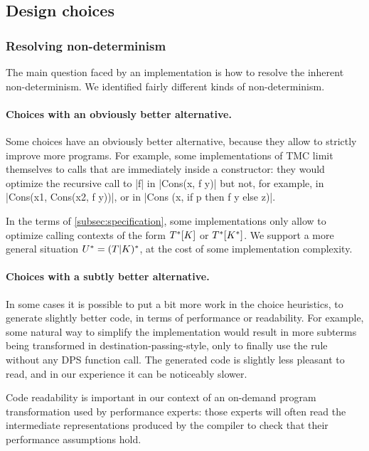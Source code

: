 \subsection{Design choices}

\subsubsection{Resolving non-determinism}

The main question faced by an implementation is how to resolve the
inherent non-determinism. We identified fairly different kinds of
non-determinism.

\paragraph{Choices with an obviously better alternative.} Some choices have an obviously better alternative, because they allow to strictly improve more programs. For example, some implementations of TMC limit themselves to calls that are immediately inside a constructor: they would optimize the recursive call to \ocaml|f| in \ocaml|Cons(x, f y)| but not, for example, in \ocaml|Cons(x1, Cons(x2, f y))|, or in \ocaml|Cons (x, if p then f y else z)|.

In the terms of \cref{subsec:specification}, some implementations only allow to optimize calling contexts of the form $\datalangTailCtx{[\datalangConsFrame]}$ or $\datalangTailCtx{[\datalangConsCtx]}$. We support a more general situation $\datalangTMCCtx = (\datalangTailFrame | \datalangConsFrame)^{*}$, at the cost of some implementation complexity.

\paragraph{Choices with a subtly better alternative.} In some cases it
is possible to put a bit more work in the choice heuristics, to
generate slightly better code, in terms of performance or
readability. For example, some natural way to simplify the
implementation would result in more subterms being transformed in
destination-passing-style, only to finally use the
 rule without any DPS function call. The generated
code is slightly less pleasant to read, and in our experience it can
be noticeably slower.

Code readability is important in our context of an on-demand program
transformation used by performance experts: those experts will often
read the intermediate representations produced by the compiler to
check that their performance assumptions hold.

